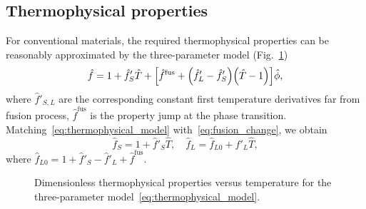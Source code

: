 \documentclass{article}
\newcommand{\fusion}[1]{{#1}^\mathrm{fus}}
\newcommand{\HT}{\hat{T}}
\newcommand{\Hf}{\hat{f}}
\newcommand{\Hphi}{\hat{\phi}}
\begin{document}
\subsection{Thermophysical properties}

For conventional materials, the required thermophysical properties can be reasonably approximated
by the three-parameter model (Fig.~\ref{fig:thermophysical})
\begin{equation}\label{eq:thermophysical_model}
    \Hf = 1 + \Hf'_S\HT + \qty[
        \fusion{\Hf} + \qty(\Hf'_L-\Hf'_S) \qty(\HT-1)
    ]\Hphi,
\end{equation}
where \(\Hf'_{S,L}\) are the corresponding constant first temperature derivatives far from fusion process,
\(\fusion{\Hf}\) is the property jump at the phase transition.
Matching~\eqref{eq:thermophysical_model} with~\eqref{eq:fusion_change}, we obtain
\begin{equation}\label{eq:thermophysical_model_explicit}
    \Hf_S = 1 + \Hf'_S\HT, \quad
    \Hf_L = \Hf_{L0} + \Hf'_L\HT,
\end{equation}
where \(\Hf_{L0} = 1 + \Hf'_S - \Hf'_L + \fusion{\Hf}\).

\begin{figure}
    \centering
    \caption{Dimensionless thermophysical properties versus temperature for the three-parameter model~\eqref{eq:thermophysical_model}.}
    \label{fig:thermophysical}
\end{figure}
\end{document}
